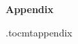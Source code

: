 \begin{center}
	\LARGE \bf {Appendix}
\end{center}


\etocdepthtag.toc{mtappendix}
\tableofcontents
\newpage

% 



